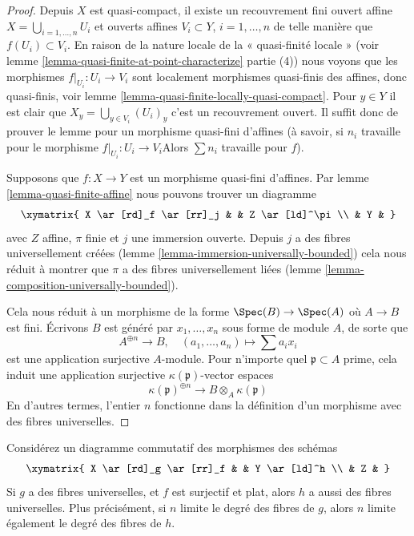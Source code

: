 \begin{proof}

Depuis $X$ est quasi-compact, il existe un recouvrement fini ouvert affine
$X = \bigcup_{i = 1, \ldots, n} U_i$ et ouverts affines $V_i \subset Y$,
$i = 1, \ldots, n$ de telle manière que $f(U_i) \subset V_i$. En raison de la nature locale de la « quasi-finité locale » (voir lemme \ref{lemma-quasi-finite-at-point-characterize} partie (4)) nous voyons que les morphismes $f|_{U_i} : U_i \to V_i$ sont localement morphismes quasi-finis des affines, donc quasi-finis, voir lemme \ref{lemma-quasi-finite-locally-quasi-compact}. Pour $y \in Y$ il est clair que $X_y = \bigcup_{y \in V_i} (U_i)_y$
c'est un recouvrement ouvert. Il suffit donc de prouver le lemme pour un morphisme quasi-fini d'affines (à savoir, si $n_i$ travaille pour le morphisme $f|_{U_i} : U_i \to V_i$Alors $\sum n_i$
travaille pour $f$).

\medskip\noindent
Supposons que $f : X \to Y$ est un morphisme quasi-fini d'affines. Par lemme \ref{lemma-quasi-finite-affine} nous pouvons trouver un diagramme $$
\xymatrix{
X \ar[rd]_f \ar[rr]_j & & Z \ar[ld]^\pi \\
& Y &
}
$$ avec $Z$ affine, $\pi$ finie et $j$ une immersion ouverte. Depuis $j$ a des fibres universellement créées (lemme \ref{lemma-immersion-universally-bounded}) cela nous réduit à montrer que $\pi$ a des fibres universellement liées (lemme \ref{lemma-composition-universally-bounded}).

\medskip\noindent
Cela nous réduit à un morphisme de la forme $\Spec(B) \to \Spec(A)$ où $A \to B$ est fini. Écrivons $B$ est généré par $x_1, \ldots, x_n$ sous forme de module $A$, de sorte que $$
A^{\oplus n} \longrightarrow B, \quad
(a_1, \ldots, a_n) \longmapsto \sum a_i x_i
$$ est une application surjective $A$-module. Pour n'importe quel $\mathfrak p \subset A$ prime, cela induit une application surjective $\kappa(\mathfrak p)$-vector espaces $$
\kappa(\mathfrak p)^{\oplus n} \longrightarrow B \otimes_A \kappa(\mathfrak p)
$$ En d'autres termes, l'entier $n$ fonctionne dans la définition d'un morphisme avec des fibres universelles.
\end{proof}

\begin{lemma}

\label{lemma-universally-bounded-permanence}
Considérez un diagramme commutatif des morphismes des schémas $$
\xymatrix{
X \ar[rd]_g \ar[rr]_f & & Y \ar[ld]^h \\
& Z &
}
$$ Si $g$ a des fibres universelles, et $f$ est surjectif et plat, alors $h$ a aussi des fibres universelles. Plus précisément, si $n$ limite le degré des fibres de $g$, alors $n$ limite également le degré des fibres de $h$.
\end{lemma}

